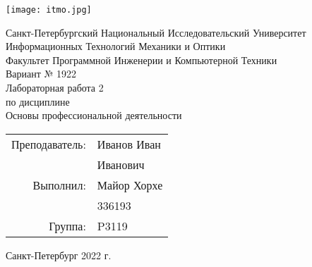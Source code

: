 \newcommand{\teachername}{Иван}
\newcommand{\teacherpatronimic}{Иванович}
\newcommand{\teacherlastname}{Иванов}
\newcommand{\studentname}{Майор Хорхе}
\newcommand{\studentcode}{336193}
\newcommand{\group}{P3119}
\newcommand{\variant}{1922}
\newcommand{\laboratorynumber}{2}
\newcommand{\subject}{Основы профессиональной деятельности}
\renewcommand{\date}{2022}

\begin{titlepage}
    \begin{center}
        {\texttt{[image: itmo.jpg]}\par}
        Санкт-Петербургский Национальный Исследовательский Университет Информационных Технологий Механики и Оптики\\
        \vspace{\fill}
        Факультет Программной Инженерии и Компьютерной Техники\\
        \vspace{\fill}
        Вариант № \variant\\
        Лабораторная работа \laboratorynumber\\
        по дисциплине\\
        \subject
    \end{center}
    
    \vspace{\fill}
    
    \begin{flushright}
        \begin{tabular}{ r l }
            Преподаватель:  & \teacherlastname{} \teachername \\
                            & \teacherpatronimic \\
            Выполнил:       & \studentname \\
                            & \studentcode \\
            Группа:         & \group \\
        \end{tabular}
    \end{flushright}

    \vspace{1em}
	
	\begin{center}
		Санкт-Петербург \date{} г. \\
	\end{center}
\end{titlepage}